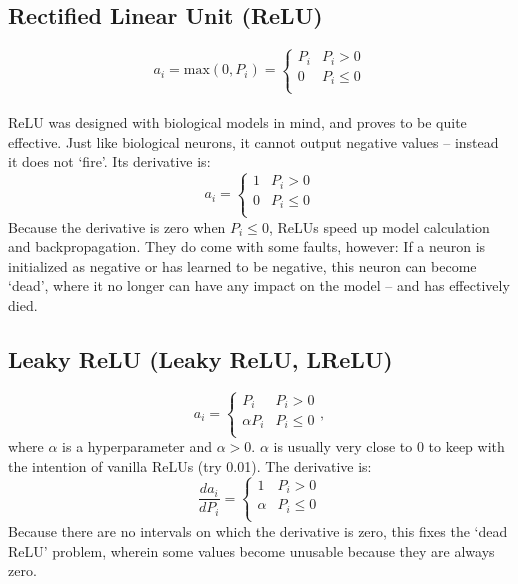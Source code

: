 \documentclass[fleqn]{article}
\begin{document}
\subsection{Rectified Linear Unit (ReLU)}
\[ a_i = \text{max}(0, P_i) = \begin{cases}
	P_i & P_i > 0\\
	0 & P_i \leq 0\\
\end{cases} \]
\\
ReLU was designed with biological models in mind, and proves to be quite
effective. Just like biological neurons, it cannot output negative values
-- instead it does not `fire'. Its derivative is:
\[ a_i = \begin{cases}
	1 & P_i > 0\\
	0 & P_i \leq 0\\
\end{cases} \]
Because the derivative is zero when $P_i \leq 0$, ReLUs speed up model
calculation and backpropagation. They do come with some faults, however:
If a neuron is initialized as negative or has learned to be negative, this
neuron can become `dead', where it no longer can have any impact on the
model -- and has effectively died.

\subsection{Leaky ReLU (Leaky ReLU, LReLU)}
\[ a_i = \begin{cases}
	P_i & P_i > 0\\
	\alpha P_i & P_i \leq 0\\
\end{cases}, \]
where $\alpha$ is a hyperparameter and $\alpha > 0$. $\alpha$ is usually
very close to $0$ to keep with the intention of vanilla ReLUs (try 0.01).
The derivative is:
\[ \frac{d a_i}{d P_i} = \begin{cases}
	1 & P_i > 0\\
	\alpha & P_i \leq 0\\
\end{cases} \]
Because there are no intervals on which the derivative is zero, this fixes
the `dead ReLU' problem, wherein some values become unusable because they
are always zero.
\end{document}
